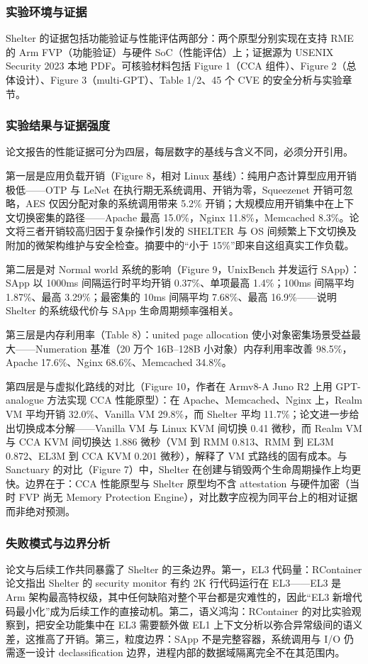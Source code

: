 \documentclass[11pt]{ctexart}
\begin{document}
\subsubsection{实验环境与证据}
Shelter 的证据包括功能验证与性能评估两部分：两个原型分别实现在支持 RME 的 Arm FVP（功能验证）与硬件 SoC（性能评估）上；证据源为 USENIX Security 2023 本地 PDF。可核验材料包括 Figure 1（CCA 组件）、Figure 2（总体设计）、Figure 3（multi-GPT）、Table 1/2、45 个 CVE 的安全分析与实验章节。\par
\subsubsection{实验结果与证据强度}
论文报告的性能证据可分为四层，每层数字的基线与含义不同，必须分开引用。\par
第一层是应用负载开销（Figure 8，相对 Linux 基线）：纯用户态计算型应用开销极低——OTP 与 LeNet 在执行期无系统调用、开销为零，Squeezenet 开销可忽略，AES 仅因分配对象的系统调用带来 5.2\% 开销；大规模应用开销集中在上下文切换密集的路径——Apache 最高 15.0\%，Nginx 11.8\%，Memcached 8.3\%。论文将三者开销较高归因于复杂操作引发的 SHELTER 与 OS 间频繁上下文切换及附加的微架构维护与安全检查。摘要中的“小于 15\%”即来自这组真实工作负载。\par
第二层是对 Normal world 系统的影响（Figure 9，UnixBench 并发运行 SApp）：SApp 以 1000ms 间隔运行时平均开销 0.37\%、单项最高 1.4\%；100ms 间隔平均 1.87\%、最高 3.29\%；最密集的 10ms 间隔平均 7.68\%、最高 16.9\%——说明 Shelter 的系统级代价与 SApp 生命周期频率强相关。\par
第三层是内存利用率（Table 8）：united page allocation 使小对象密集场景受益最大——Numeration 基准（20 万个 16B--128B 小对象）内存利用率改善 98.5\%，Apache 17.6\%、Nginx 68.6\%、Memcached 34.8\%。\par
第四层是与虚拟化路线的对比（Figure 10，作者在 Armv8-A Juno R2 上用 GPT-analogue 方法实现 CCA 性能原型）：在 Apache、Memcached、Nginx 上，Realm VM 平均开销 32.0\%、Vanilla VM 29.8\%，而 Shelter 平均 11.7\%；论文进一步给出切换成本分解——Vanilla VM 与 Linux KVM 间切换 0.41 微秒，而 Realm VM 与 CCA KVM 间切换达 1.886 微秒（VM 到 RMM 0.813、RMM 到 EL3M 0.872、EL3M 到 CCA KVM 0.201 微秒），解释了 VM 式路线的固有成本。与 Sanctuary 的对比（Figure 7）中，Shelter 在创建与销毁两个生命周期操作上均更快。边界在于：CCA 性能原型与 Shelter 原型均不含 attestation 与硬件加密（当时 FVP 尚无 Memory Protection Engine），对比数字应视为同平台上的相对证据而非绝对预测。\par
\subsubsection{失败模式与边界分析}
论文与后续工作共同暴露了 Shelter 的三条边界。第一，EL3 代码量：RContainer 论文指出 Shelter 的 security monitor 有约 2K 行代码运行在 EL3——EL3 是 Arm 架构最高特权级，其中任何缺陷对整个平台都是灾难性的，因此“EL3 新增代码最小化”成为后续工作的直接动机。第二，语义鸿沟：RContainer 的对比实验观察到，把安全功能集中在 EL3 需要额外做 EL1 上下文分析以弥合异常级间的语义差，这推高了开销。第三，粒度边界：SApp 不是完整容器，系统调用与 I/O 仍需逐一设计 declassification 边界，进程内部的数据域隔离完全不在其范围内。\par
\end{document}
